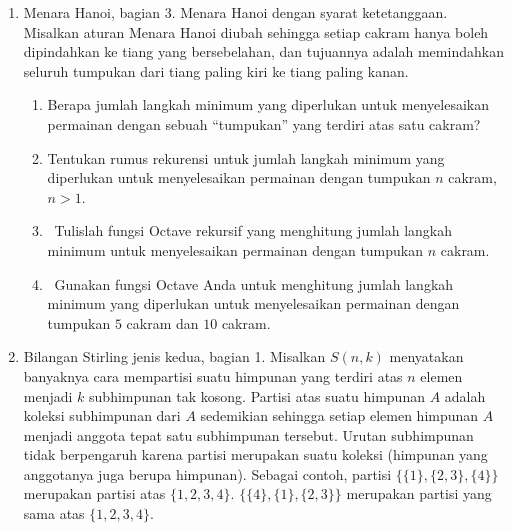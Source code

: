 \begin{enumerate}
\begin{enumerate}
\item Dengan memulai dari sebuah ``tumpukan'' yang hanya terdiri dari
satu cakram, berapakah jumlah langkah minimum yang diperlukan untuk
menyelesaikan permainan?
\item \octave\ Gunakan jawaban Anda untuk bagian (a), bersama generalisasi
jawaban Anda atas soal  \ref{enu:tower-recursion} untuk menulis fungsi
Octave rekursif yang menghitung jumlah langkah minimum yang diperlukan
untuk menyelesaikan permainan dengan tumpukan $n$ cakram.
\item \octave\ Gunakan fungsi Octave Anda untuk memverifikasi bahwa jumlah
langkah minimum untuk menyelesaikan permainan dengan tumpukan 10 cakram
adalah 1023.
\end{enumerate}
\item Menara Hanoi, bagian 3. Menara Hanoi dengan syarat ketetanggaan. Misalkan
aturan Menara Hanoi diubah sehingga setiap cakram hanya boleh dipindahkan
ke tiang yang bersebelahan, dan tujuannya adalah memindahkan seluruh
tumpukan dari tiang paling kiri ke tiang paling kanan.

\begin{enumerate}
\item Berapa jumlah langkah minimum yang diperlukan untuk menyelesaikan
permainan dengan sebuah  ``tumpukan'' yang terdiri atas satu cakram?
\item Tentukan rumus rekurensi untuk jumlah langkah minimum yang diperlukan
untuk menyelesaikan permainan dengan tumpukan $n$ cakram, $n>1$.
\item \octave\ Tulislah fungsi Octave rekursif yang menghitung jumlah langkah
minimum untuk menyelesaikan permainan dengan tumpukan $n$ cakram.
\item \octave\ Gunakan fungsi Octave Anda untuk menghitung jumlah langkah
minimum yang diperlukan untuk menyelesaikan permainan dengan tumpukan
$5$ cakram dan  $10$ cakram.
\end{enumerate}
\item Bilangan Stirling jenis kedua, bagian 1. Misalkan $S(n,k)$ menyatakan
banyaknya cara mempartisi suatu himpunan yang terdiri atas $n$ elemen
menjadi $k$ subhimpunan tak kosong. Partisi atas suatu himpunan $A$
adalah koleksi subhimpunan dari $A$ sedemikian sehingga setiap elemen
himpunan $A$ menjadi anggota tepat satu subhimpunan tersebut. Urutan
subhimpunan tidak berpengaruh karena partisi merupakan suatu koleksi
(himpunan yang anggotanya juga berupa himpunan). Sebagai contoh, partisi
$\{\{1\},\{2,3\},\{4\}\}$ merupakan partisi atas $\{1,2,3,4\}$.
$\{\{4\},\{1\},\{2,3\}\}$ merupakan partisi yang sama atas $\{1,2,3,4\}$.


\end{enumerate}
